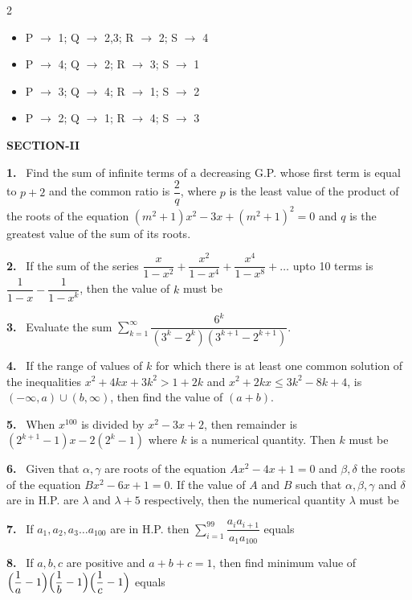 \documentclass[10pt]{extarticle}
\newcommand{\sect}[1]{\par\smallskip\noindent\textbf{#1}\par}
\newcommand{\qn}[1]{\par\smallskip\noindent\textbf{#1.}~}
\newenvironment{qoptions}{\begin{itemize}[leftmargin=1.8em,itemsep=1pt,topsep=2pt,label={}]}{\end{itemize}}
\newcommand{\opt}[2]{\item[(#1)] #2}
\begin{document}
\begin{multicols}{2}
\begin{qoptions}
\opt{A}{P $\to$ 1; Q $\to$ 2,3; R $\to$ 2; S $\to$ 4}
\opt{B}{P $\to$ 4; Q $\to$ 2; R $\to$ 3; S $\to$ 1}
\opt{C}{P $\to$ 3; Q $\to$ 4; R $\to$ 1; S $\to$ 2}
\opt{D}{P $\to$ 2; Q $\to$ 1; R $\to$ 4; S $\to$ 3}
\end{qoptions}
\sect{SECTION-II}
\qn{1} Find the sum of infinite terms of a decreasing G.P. whose first term is equal to $p+2$ and the common ratio is $\dfrac2q$, where $p$ is the least value of the product of the roots of the equation $(m^2+1)x^2-3x+(m^2+1)^2=0$ and $q$ is the greatest value of the sum of its roots.
\qn{2} If the sum of the series $\dfrac x{1-x^2}+\dfrac{x^2}{1-x^4}+\dfrac{x^4}{1-x^8}+\ldots$ upto 10 terms is $\dfrac1{1-x}-\dfrac1{1-x^k}$, then the value of $k$ must be
\qn{3} Evaluate the sum $\displaystyle\sum_{k=1}^{\infty}\dfrac{6^k}{(3^k-2^k)(3^{k+1}-2^{k+1})}$.
\qn{4} If the range of values of $k$ for which there is at least one common solution of the inequalities $x^2+4kx+3k^2>1+2k$ and $x^2+2kx\le3k^2-8k+4$, is $(-\infty,a)\cup(b,\infty)$, then find the value of $(a+b)$.
\qn{5} When $x^{100}$ is divided by $x^2-3x+2$, then remainder is $(2^{k+1}-1)x-2(2^k-1)$ where $k$ is a numerical quantity. Then $k$ must be
\qn{6} Given that $\alpha,\gamma$ are roots of the equation $Ax^2-4x+1=0$ and $\beta,\delta$ the roots of the equation $Bx^2-6x+1=0$. If the value of $A$ and $B$ such that $\alpha,\beta,\gamma$ and $\delta$ are in H.P. are $\lambda$ and $\lambda+5$ respectively, then the numerical quantity $\lambda$ must be
\qn{7} If $a_1,a_2,a_3\ldots a_{100}$ are in H.P. then $\displaystyle\sum_{i=1}^{99}\dfrac{a_ia_{i+1}}{a_1a_{100}}$ equals
\qn{8} If $a,b,c$ are positive and $a+b+c=1$, then find minimum value of $\Bigl(\dfrac1a-1\Bigr)\Bigl(\dfrac1b-1\Bigr)\Bigl(\dfrac1c-1\Bigr)$ equals

\end{multicols}
\end{document}
